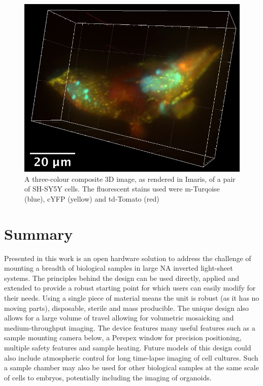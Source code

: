\begin{figure}
    \centering
    \includegraphics[width=0.8\linewidth]{./cell_image}
    \caption[A three-colour composite 3D image of a pair of \gls{SH-SY5Y} cells]{
    A three-colour composite 3D image, as rendered in Imaris, of a pair of \gls{SH-SY5Y} cells.
    The fluorescent stains used were m-Turqoise (blue), cYFP (yellow) and td-Tomato (red)}\label{fig:cell_image}
\end{figure}

\section{Summary}

Presented in this work is an open hardware solution to address the challenge of mounting a breadth of biological samples in large \gls{NA} inverted light-sheet systems.
The principles behind the design can be used directly, applied and extended to provide a robust starting point for which users can easily modify for their needs.
Using a single piece of  material means the unit is robust (as it has no moving parts), disposable, sterile and mass producible.
The unique design also allows for a large volume of travel allowing for volumetric mosaicking and medium-throughput imaging.
The device features many useful features such as a sample mounting camera below, a Perspex window for precision positioning, multiple safety features and sample heating.
Future models of this design could also include atmospheric control for long time-lapse imaging of cell cultures.
Such a sample chamber may also be used for other biological samples at the same scale of cells to embryos, potentially including the imaging of \gls{organoid}s.

